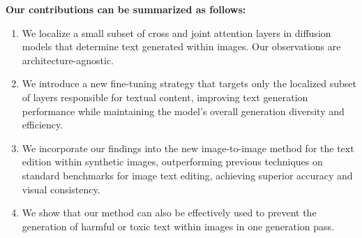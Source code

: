 \textbf{Our contributions can be summarized as follows:}

\begin{enumerate}
    \item We localize a small subset of cross and joint attention layers in diffusion models that determine text generated within images. Our observations are architecture-agnostic.
    \item We introduce a new fine-tuning strategy that targets only the localized subset of layers responsible for textual content, improving text generation performance while maintaining the model’s overall generation diversity and efficiency.
    \item We incorporate our findings into the new image-to-image method for the text edition within synthetic images, outperforming previous techniques on standard benchmarks for image text editing, achieving superior accuracy and visual consistency.
    \item We show that our method can also be effectively used to prevent the generation of harmful or toxic text within images in one generation pass.
\end{enumerate}



